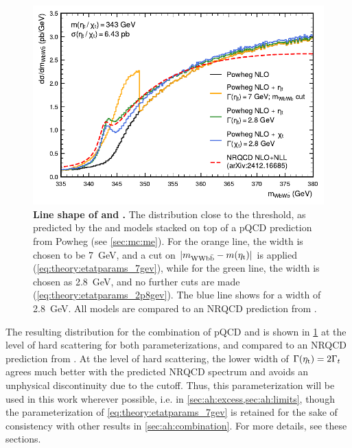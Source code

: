 \begin{figure}[t]
    \centering
    \includegraphics[width=0.8\linewidth]{figures/ah/powheg_etat_nlo.pdf}
    \caption{\textbf{Line shape of \etat and \chit.} The \mWWbb distribution close to the \ttbar threshold, as predicted by the \etat and \chit models stacked on top of a pQCD \ttbar prediction from Powheg \hvq (see \cref{sec:mc:me}). For the orange line, the \etat width is chosen to be \SI{7}{\GeV}, and a cut on $|m_{\mathrm{WWb\bar{b}}} - m(\mathrm{\eta_t})|$ is applied (\cref{eq:theory:etatparams_7gev}), while for the green line, the \etat width is chosen as \SI{2.8}{\GeV}, and no further cuts are made (\cref{eq:theory:etatparams_2p8gev}). The blue line shows \chit for a width of \SI{2.8}{\GeV}. All models are compared to an NRQCD prediction from .}
    \label{fig:theory:etat}
\end{figure}

The resulting \mWWbb distribution for the combination of pQCD \ttbar and \etat is shown in \cref{fig:theory:etat} at the level of hard scattering for both parameterizations, and compared to an NRQCD prediction from .
At the level of hard scattering, the lower width of $\Gamma(\mathrm{\eta_t}) = 2 \Gamma_t$ agrees much better with the predicted NRQCD spectrum and avoids an unphysical discontinuity due to the \mWWbb cutoff. Thus, this parameterization will be used in this work wherever possible, i.e. in \cref{sec:ah:excess,sec:ah:limits}, though the parameterization of \cref{eq:theory:etatparams_7gev} is retained for the sake of consistency with other results in \cref{sec:ah:combination}. For more details, see these sections.

